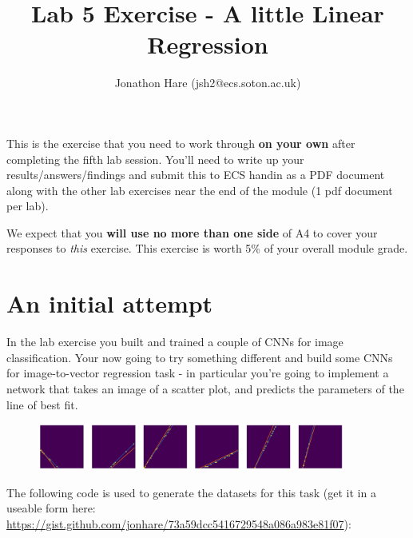 \documentclass[a4paper]{article}
\begin{document}
\lstset{language=Python,upquote=true}

\setlength{\leftskip}{20pt}
\title{Lab 5 Exercise - A little Linear Regression}
\author{Jonathon Hare (jsh2@ecs.soton.ac.uk)}

\maketitle


This is the exercise that you need to work through \textbf{on your own} after completing the fifth lab session. You'll need to write up your results/answers/findings and submit this to ECS handin as a PDF document along with the other lab exercises near the end of the module (1 pdf document per lab). 

We expect that you \textbf{will use no more than one side} of A4 to cover your responses to \emph{this} exercise. This exercise is worth 5\% of your overall module grade.

\section{An initial attempt}\label{init}

In the lab exercise you built and trained a couple of CNNs for image classification. Your now going to try something different and build some CNNs for image-to-vector regression task - in particular you're going to implement a network that takes an image of a scatter plot, and predicts the parameters of the line of best fit.

\begin{figure}[h!]
\center
	\includegraphics[width=0.9\textwidth]{plots.png}
\end{figure}

The following code is used to generate the datasets for this task (get it in a useable form here: \url{https://gist.github.com/jonhare/73a59dcc5416729548a086a983e81f07}):
\end{document}
